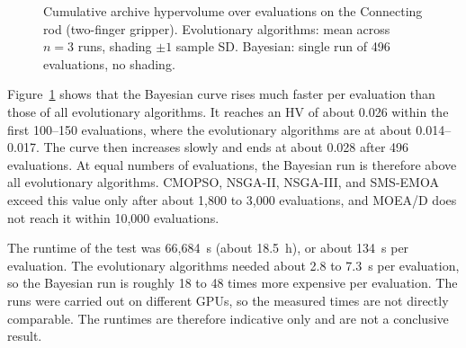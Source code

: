 \begin{figure}[H]
    \centering
    \caption{Cumulative archive hypervolume over evaluations on the Connecting rod
    (two-finger gripper). Evolutionary algorithms: mean across $n=3$ runs, shading
    $\pm 1$ sample SD. Bayesian: single run of 496 evaluations, no shading.}
    \label{fig:bayesian_hv_progression}
\end{figure}

Figure~\ref{fig:bayesian_hv_progression} shows that the Bayesian curve rises much faster
per evaluation than those of all evolutionary algorithms. It reaches an HV of about 0.026
within the first 100--150 evaluations, where the evolutionary algorithms are at about
0.014--0.017. The curve then increases slowly and ends at about 0.028 after 496
evaluations. At equal numbers of evaluations, the Bayesian run is therefore above all
evolutionary algorithms. CMOPSO, NSGA-II, NSGA-III, and SMS-EMOA exceed this value only
after about 1{,}800 to 3{,}000 evaluations, and MOEA/D does not reach it within 10{,}000
evaluations.


The runtime of the test was 66{,}684~s (about 18.5~h), or about 134~s per evaluation. The
evolutionary algorithms needed about 2.8 to 7.3~s per evaluation, so the Bayesian run
is roughly 18 to 48 times more expensive per evaluation. The runs were carried out on different
GPUs, so the measured times are not directly comparable. The runtimes are therefore
indicative only and are not a conclusive result.
